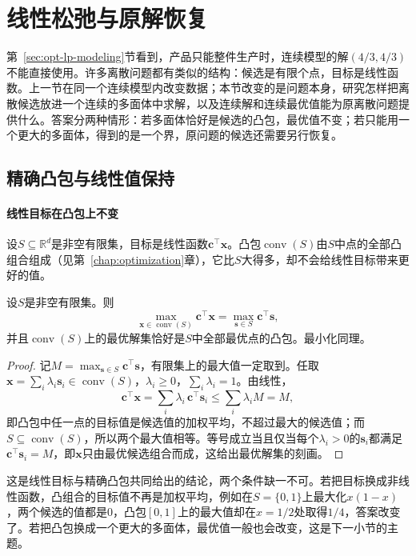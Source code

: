 \section{线性松弛与原解恢复}
\label{sec:opt-lp-relaxation}

第~\ref{sec:opt-lp-modeling}节看到，产品只能整件生产时，连续模型的解$(4/3,4/3)$不能直接使用。许多离散问题都有类似的结构：候选是有限个点，目标是线性函数。上一节在同一个连续模型内改变数据；本节改变的是问题本身，研究怎样把离散候选放进一个连续的多面体中求解，以及连续解和连续最优值能为原离散问题提供什么。答案分两种情形：若多面体恰好是候选的凸包，最优值不变；若只能用一个更大的多面体，得到的是一个界，原问题的候选还需要另行恢复。

\subsection{精确凸包与线性值保持}
\label{sec:opt-lp-convex-hull}

\paragraph{线性目标在凸包上不变}
设$S\subseteq\mathbb R^d$是非空有限集，目标是线性函数$\bm c^\top\bm x$。凸包$\operatorname{conv}(S)$由$S$中点的全部凸组合组成（见第~\ref{chap:optimization}章），它比$S$大得多，却不会给线性目标带来更好的值。

\begin{theorem}[凸包上的线性值保持]
\label{thm:opt-lp-hull-value}
设$S$是非空有限集。则
\[
  \max_{\bm x\in\operatorname{conv}(S)}\bm c^\top\bm x=\max_{\bm s\in S}\bm c^\top\bm s,
\]
并且$\operatorname{conv}(S)$上的最优解集恰好是$S$中全部最优点的凸包。最小化同理。
\end{theorem}

\begin{proof}
记$M=\max_{\bm s\in S}\bm c^\top\bm s$，有限集上的最大值一定取到。任取$\bm x=\sum_i\lambda_i\bm s_i\in\operatorname{conv}(S)$，$\lambda_i\ge0$，$\sum_i\lambda_i=1$。由线性，
\[
  \bm c^\top\bm x=\sum_i\lambda_i\,\bm c^\top\bm s_i\le\sum_i\lambda_iM=M,
\]
即凸包中任一点的目标值是候选值的加权平均，不超过最大的候选值；而$S\subseteq\operatorname{conv}(S)$，所以两个最大值相等。等号成立当且仅当每个$\lambda_i>0$的$\bm s_i$都满足$\bm c^\top\bm s_i=M$，即$\bm x$只由最优候选组合而成，这给出最优解集的刻画。
\end{proof}

这是线性目标与精确凸包共同给出的结论，两个条件缺一不可。若把目标换成非线性函数，凸组合的目标值不再是加权平均，例如在$S=\{0,1\}$上最大化$x(1-x)$，两个候选的值都是$0$，凸包$[0,1]$上的最大值却在$x=1/2$处取得$1/4$，答案改变了。若把凸包换成一个更大的多面体，最优值一般也会改变，这是下一小节的主题。

